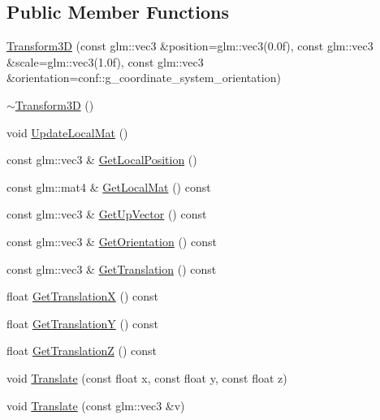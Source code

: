 \subsection*{Public Member Functions}
\begin{DoxyCompactItemize}
\item 
\mbox{\hyperlink{classec_1_1_transform3_d_aec13468ee4386a737b62c780086e9f95}{Transform3D}} (const glm\+::vec3 \&position=glm\+::vec3(0.\+0f), const glm\+::vec3 \&scale=glm\+::vec3(1.\+0f), const glm\+::vec3 \&orientation=conf\+::g\+\_\+coordinate\+\_\+system\+\_\+orientation)
\item 
\mbox{\hyperlink{classec_1_1_transform3_d_a1df4b7afcf78aef64719b2302cfac864}{$\sim$\+Transform3D}} ()
\item 
void \mbox{\hyperlink{classec_1_1_transform3_d_a9af1af38089385c5b2100fe5f98f33ca}{Update\+Local\+Mat}} ()
\item 
const glm\+::vec3 \& \mbox{\hyperlink{classec_1_1_transform3_d_a69a9688cbe54695c5798eb532b7f1a30}{Get\+Local\+Position}} ()
\item 
const glm\+::mat4 \& \mbox{\hyperlink{classec_1_1_transform3_d_a39bf61001742803f82e888e2b64a58f4}{Get\+Local\+Mat}} () const
\item 
const glm\+::vec3 \& \mbox{\hyperlink{classec_1_1_transform3_d_ace4e850baa2cbbbbcbe12613eb6851a8}{Get\+Up\+Vector}} () const
\item 
const glm\+::vec3 \& \mbox{\hyperlink{classec_1_1_transform3_d_a84ad94cea6d167aedfc640bcf1165ea7}{Get\+Orientation}} () const
\item 
const glm\+::vec3 \& \mbox{\hyperlink{classec_1_1_transform3_d_a71b999a8cf046109562a5335c9af7c77}{Get\+Translation}} () const
\item 
float \mbox{\hyperlink{classec_1_1_transform3_d_ae95b9e3b8b535ae7ab0e109ea82b4585}{Get\+TranslationX}} () const
\item 
float \mbox{\hyperlink{classec_1_1_transform3_d_a59f4bf735a15afa5dad75106e15e8691}{Get\+TranslationY}} () const
\item 
float \mbox{\hyperlink{classec_1_1_transform3_d_a85f04530ab18f8266e8741eca1e69315}{Get\+TranslationZ}} () const
\item 
void \mbox{\hyperlink{classec_1_1_transform3_d_a553b6e61a45aae2661bcb5568613a32a}{Translate}} (const float x, const float y, const float z)
\item 
void \mbox{\hyperlink{classec_1_1_transform3_d_a9935de1ebeecdd4bfd58073c1ea1b854}{Translate}} (const glm\+::vec3 \&v)
\item 

\end{DoxyCompactItemize}

